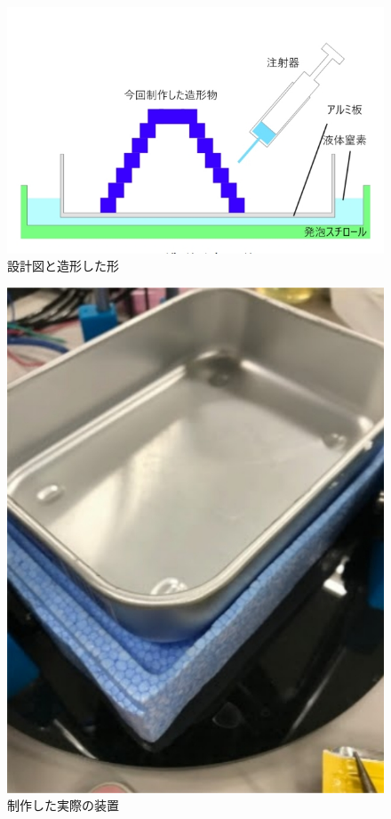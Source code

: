 \begin{figure}[H]
  \centering
  \includegraphics[width=10truecm]{./fig/yobi2.jpg}
  \caption{設計図と造形した形}
  \label{fig:yobitamesi}
\end{figure}

\begin{figure}[H]
  \centering
  \includegraphics[width=9truecm]{./fig/yobi34.jpg}
  \caption{制作した実際の装置}
  \label{fig:yobipure}
\end{figure}

